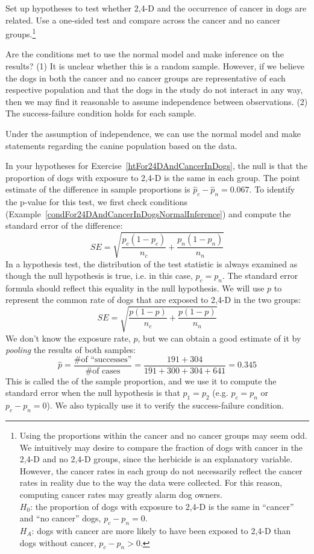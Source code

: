 \begin{exercise} \label{htFor24DAndCancerInDogs}
Set up hypotheses to test whether 2,4-D and the occurrence of cancer in dogs are related. Use a one-sided test and compare across the cancer and no cancer groups.\footnote{Using the proportions within the cancer and no cancer groups may seem odd. We intuitively may desire to compare the fraction of dogs with cancer in the 2,4-D and no 2,4-D groups, since the herbicide is an explanatory variable. However, the cancer rates in each group do not necessarily reflect the cancer rates in reality due to the way the data were collected. For this reason, computing cancer rates may greatly alarm dog owners. \\ $H_0$: the proportion of dogs with exposure to 2,4-D is the same in ``cancer'' and ``no cancer'' dogs, $p_c - p_n = 0$. \\ $H_A$: dogs with cancer are more likely to have been exposed to 2,4-D than dogs without cancer, $p_c - p_n > 0$.}
\end{exercise}

\begin{example}{Are the conditions met to use the normal model and make inference on the results?}\label{condFor24DAndCancerInDogsNormalInference}
(1) It is unclear whether this is a random sample. However, if we believe the dogs in both the cancer and no cancer groups are representative of each respective population and that the dogs in the study do not interact in any way, then we may find it reasonable to assume independence between observations. (2) The success-failure condition holds for each sample.

Under the assumption of independence, we can use the normal model and make statements regarding the canine population based on the data.
\end{example}

In your hypotheses for Exercise~\ref{htFor24DAndCancerInDogs}, the null is that the proportion of dogs with exposure to 2,4-D is the same in each group. The point estimate of the difference in sample proportions is $\hat{p}_c - \hat{p}_n = 0.067$. To identify the p-value for this test, we first check conditions (Example~\ref{condFor24DAndCancerInDogsNormalInference}) and compute the standard error of the difference:
$$SE = \sqrt{\frac{p_c(1-p_c)}{n_c} + \frac{p_n(1-p_n)}{n_n}}$$
In a hypothesis test, the distribution of the test statistic is always examined as though the null hypothesis is true, i.e. in this case, $p_c = p_n$. The standard error formula should reflect this equality in the null hypothesis. We will use $p$ to represent the common rate of dogs that are exposed to 2,4-D in the two groups:
$$SE = \sqrt{\frac{p(1-p)}{n_c} + \frac{p(1-p)}{n_n}}$$
We don't know the exposure rate, $p$, but we can obtain a good estimate of it by \emph{pooling} the results of both samples:
$$\hat{p} = \frac{\text{\# of ``successes''}}{\text{\# of cases}} = \frac{191 + 304}{191+300+304+641} = 0.345$$
This is called the  of the sample proportion, and we use it to compute the standard error when the null hypothesis is that $p_1 = p_2$ (e.g. $p_c = p_n$ or $p_c - p_n = 0$). We also typically use it to verify the success-failure condition.

